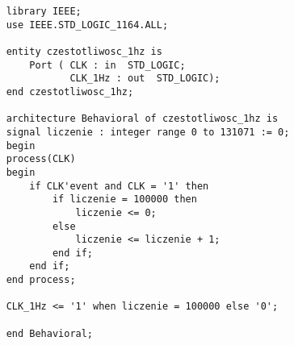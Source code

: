 \begin{lstlisting}
    library IEEE;
    use IEEE.STD_LOGIC_1164.ALL;
    
    entity czestotliwosc_1hz is
        Port ( CLK : in  STD_LOGIC;
               CLK_1Hz : out  STD_LOGIC);
    end czestotliwosc_1hz;
    
    architecture Behavioral of czestotliwosc_1hz is
    signal liczenie : integer range 0 to 131071 := 0;
    begin
    process(CLK)
    begin
        if CLK'event and CLK = '1' then
            if liczenie = 100000 then
                liczenie <= 0;
            else
                liczenie <= liczenie + 1;
            end if;
        end if;
    end process;
    
    CLK_1Hz <= '1' when liczenie = 100000 else '0';
    
    end Behavioral;
\end{lstlisting}